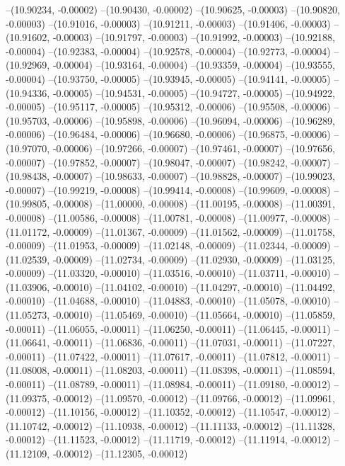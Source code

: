--(10.90234, -0.00002)
--(10.90430, -0.00002)
--(10.90625, -0.00003)
--(10.90820, -0.00003)
--(10.91016, -0.00003)
--(10.91211, -0.00003)
--(10.91406, -0.00003)
--(10.91602, -0.00003)
--(10.91797, -0.00003)
--(10.91992, -0.00003)
--(10.92188, -0.00004)
--(10.92383, -0.00004)
--(10.92578, -0.00004)
--(10.92773, -0.00004)
--(10.92969, -0.00004)
--(10.93164, -0.00004)
--(10.93359, -0.00004)
--(10.93555, -0.00004)
--(10.93750, -0.00005)
--(10.93945, -0.00005)
--(10.94141, -0.00005)
--(10.94336, -0.00005)
--(10.94531, -0.00005)
--(10.94727, -0.00005)
--(10.94922, -0.00005)
--(10.95117, -0.00005)
--(10.95312, -0.00006)
--(10.95508, -0.00006)
--(10.95703, -0.00006)
--(10.95898, -0.00006)
--(10.96094, -0.00006)
--(10.96289, -0.00006)
--(10.96484, -0.00006)
--(10.96680, -0.00006)
--(10.96875, -0.00006)
--(10.97070, -0.00006)
--(10.97266, -0.00007)
--(10.97461, -0.00007)
--(10.97656, -0.00007)
--(10.97852, -0.00007)
--(10.98047, -0.00007)
--(10.98242, -0.00007)
--(10.98438, -0.00007)
--(10.98633, -0.00007)
--(10.98828, -0.00007)
--(10.99023, -0.00007)
--(10.99219, -0.00008)
--(10.99414, -0.00008)
--(10.99609, -0.00008)
--(10.99805, -0.00008)
--(11.00000, -0.00008)
--(11.00195, -0.00008)
--(11.00391, -0.00008)
--(11.00586, -0.00008)
--(11.00781, -0.00008)
--(11.00977, -0.00008)
--(11.01172, -0.00009)
--(11.01367, -0.00009)
--(11.01562, -0.00009)
--(11.01758, -0.00009)
--(11.01953, -0.00009)
--(11.02148, -0.00009)
--(11.02344, -0.00009)
--(11.02539, -0.00009)
--(11.02734, -0.00009)
--(11.02930, -0.00009)
--(11.03125, -0.00009)
--(11.03320, -0.00010)
--(11.03516, -0.00010)
--(11.03711, -0.00010)
--(11.03906, -0.00010)
--(11.04102, -0.00010)
--(11.04297, -0.00010)
--(11.04492, -0.00010)
--(11.04688, -0.00010)
--(11.04883, -0.00010)
--(11.05078, -0.00010)
--(11.05273, -0.00010)
--(11.05469, -0.00010)
--(11.05664, -0.00010)
--(11.05859, -0.00011)
--(11.06055, -0.00011)
--(11.06250, -0.00011)
--(11.06445, -0.00011)
--(11.06641, -0.00011)
--(11.06836, -0.00011)
--(11.07031, -0.00011)
--(11.07227, -0.00011)
--(11.07422, -0.00011)
--(11.07617, -0.00011)
--(11.07812, -0.00011)
--(11.08008, -0.00011)
--(11.08203, -0.00011)
--(11.08398, -0.00011)
--(11.08594, -0.00011)
--(11.08789, -0.00011)
--(11.08984, -0.00011)
--(11.09180, -0.00012)
--(11.09375, -0.00012)
--(11.09570, -0.00012)
--(11.09766, -0.00012)
--(11.09961, -0.00012)
--(11.10156, -0.00012)
--(11.10352, -0.00012)
--(11.10547, -0.00012)
--(11.10742, -0.00012)
--(11.10938, -0.00012)
--(11.11133, -0.00012)
--(11.11328, -0.00012)
--(11.11523, -0.00012)
--(11.11719, -0.00012)
--(11.11914, -0.00012)
--(11.12109, -0.00012)
--(11.12305, -0.00012)
